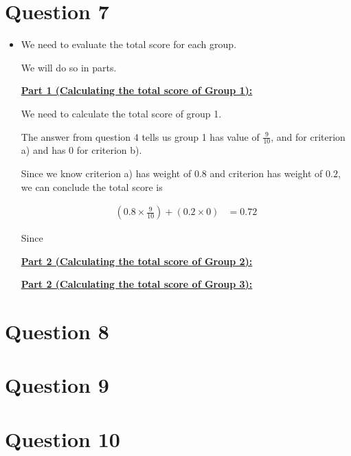 \documentclass[12pt]{article}
\begin{document}
\section*{Question 7}
\begin{itemize}
    \item

    We need to evaluate the total score for each group.

    \bigskip

    We will do so in parts.

    \bigskip

    \underline{\textbf{Part 1 (Calculating the total score of Group 1):}}

    \bigskip

    We need to calculate the total score of group 1.

    \bigskip

    The answer from question 4 tells us group 1 has value of $\frac{9}{10}$, and
    for criterion a) and has $0$ for criterion b).

    \bigskip

    Since we know criterion a) has weight of $0.8$ and criterion has weight of $0.2$,
    we can conclude the total score is

    \begin{align}
        (0.8 \times \frac{9}{10}) + (0.2 \times 0 ) &= 0.72
    \end{align}

    \bigskip

    Since

    \underline{\textbf{Part 2 (Calculating the total score of Group 2):}}

    \bigskip

    \underline{\textbf{Part 2 (Calculating the total score of Group 3):}}
\end{itemize}

\section*{Question 8}

\section*{Question 9}

\section*{Question 10}
\end{document}
